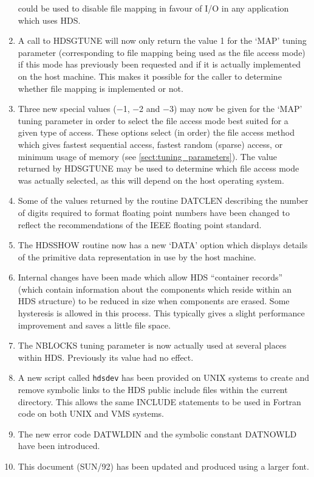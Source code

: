 \documentclass[twoside,11pt]{article}
\newcommand{\htmlref}[2]{#1}
\renewcommand{\_}{\texttt{\symbol{95}}}
\newcommand{\hi}[1]{{\tt{#1}}}
\newcommand{\qt}[1]{``#1''}
\newcommand{\qt}[1]{{\tt{"}}#1{\tt{"}}}
\begin{document}
\begin{enumerate}
could be used to disable file mapping in favour of I/O in any
application which uses HDS.

\item
A call to \htmlref{HDS\_GTUNE}{HDS_GTUNE} will now only return the
value 1 for the `MAP' tuning parameter (corresponding to file mapping
being used as the file access mode) if this mode has previously been
requested and if it is actually implemented on the host machine. This
makes it possible for the caller to determine whether file mapping is
implemented or not.

\item
Three new special values ($-$1, $-$2 and $-$3) may now be given for
the `MAP' tuning parameter in order to select the file access mode
best suited for a given type of access. These options select (in
order) the file access method which gives fastest sequential access,
fastest random (sparse) access, or minimum usage of memory (see
\ref{sect:tuning_parameters}). The value returned by
\htmlref{HDS\_GTUNE}{HDS_GTUNE} may be used to determine which file
access mode was actually selected, as this will depend on the host
operating system.

\item
Some of the values returned by the routine
\htmlref{DAT\_CLEN}{DAT_CLEN} describing the number of digits required
to format floating point numbers have been changed to reflect the
recommendations of the IEEE floating point standard.

\item
The \htmlref{HDS\_SHOW}{HDS_SHOW} routine now has a new `DATA' option
which displays details of the primitive data representation in use by
the host machine.

\item
Internal changes have been made which allow HDS \qt{container records}
(which contain information about the components which reside within an
HDS structure) to be reduced in size when components are erased. Some
hysteresis is allowed in this process. This typically gives a slight
performance improvement and saves a little file space.

\item
The NBLOCKS tuning parameter is now actually used at several places
within HDS.  Previously its value had no effect.

\item
A new script called \hi{hds\_dev} has been provided on UNIX systems
to create and remove symbolic links to the HDS public include files
within the current directory. This allows the same INCLUDE statements
to be used in Fortran code on both UNIX and VMS systems.

\item
The new error code DAT\_\_WLDIN and the symbolic constant DAT\_\_NOWLD
have been introduced.

\item
This document (SUN/92) has been updated and produced using a larger
font.

\end{enumerate}
\end{document}
